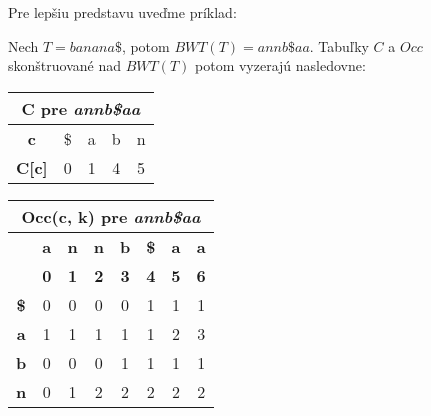     \bigskip
    
    Pre lepšiu predstavu uveďme príklad:
    
    \begin{example}
        \label{ex:fm_index}
        Nech $T = banana\$$, potom $BWT(T) = annb\$aa$. Tabuľky $C$ a $Occ$ skonštruované nad $BWT(T)$ potom vyzerajú nasledovne:
        
        \bigskip
        
        \begin{minipage}{2.5in}
            \begin{tabular}{ | c | c | c | c | c | }
                \multicolumn{5}{c}{\textbf{C pre \emph{annb\$aa}}} \\ \hline
                \textbf{c}    & \$ & a & b & n                     \\ \hline
                \textbf{C[c]} & 0  & 1 & 4 & 5                     \\ \hline
            \end{tabular}
        \end{minipage}
        \begin{minipage}{2.5in}
            \begin{tabular}{ | c | c | c | c | c | c | c | c | }
                \multicolumn{8}{c}{\textbf{Occ(c, k) pre \emph{annb\$aa}}} \\ \hline
                            & \textbf{a} & \textbf{n} & \textbf{n} & \textbf{b} & \textbf{\$} & \textbf{a} & \textbf{a} \\ \hline
                            & \textbf{0} & \textbf{1} & \textbf{2} & \textbf{3} & \textbf{4}  & \textbf{5} & \textbf{6} \\ \hline
                \textbf{\$} & 0          & 0          & 0          & 0          & 1           & 1 & 1 \\ \hline                 
                \textbf{a}  & 1          & 1          & 1          & 1          & 1           & 2 & 3 \\ \hline
                \textbf{b}  & 0          & 0          & 0          & 1          & 1           & 1 & 1 \\ \hline  
                \textbf{n}  & 0          & 1          & 2          & 2          & 2           & 2 & 2 \\ \hline
            \end{tabular}
        \end{minipage}
    \end{example}

